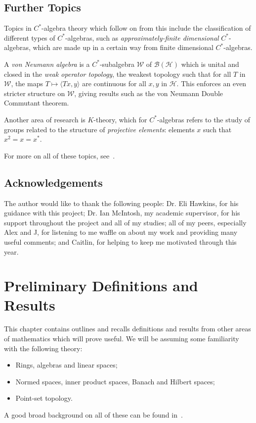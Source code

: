 \documentclass[11pt,a4paper]{report}
\theoremstyle{plain}
\theoremstyle{definition}
\newcommand{\1}{\mathbbm{1}}
\renewcommand{\H}{\mathcal{H}}
\newcommand{\W}{\mathcal{W}}
\newcommand{\B}{\mathcal{B}}
\newcommand{\BH}{\mathcal{\B(\H)}}
\begin{document}
\section{Further Topics}
Topics in $C^\ast$-algebra theory which follow on from this include the 
classification of different types of $C^\ast$-algebras, such as 
\emph{approximately-finite dimensional} $C^\ast$-algebras, which are made up in 
a certain way from finite dimensional $C^\ast$-algebras.

A \emph{von Neumann algebra }is a $C^\ast$-subalgebra $\W$ of $\BH$ which is 
unital and closed in the \emph{weak operator topology}, the weakest topology 
such that for all $T$ in $\W$, the maps $T\mapsto\langle Tx,y\rangle$ are 
continuous for all $x,y$ in $\H$. This enforces an even stricter structure on 
$\W$, giving results such as the von Neumann Double Commutant theorem.

Another area of research is $K$-theory, which for $C^\ast$-algebras refers to 
the study of groups related to the structure of \emph{projective elements}:
elements $x$ such that $x^2 = x = x^\ast$.

For more on all of these topics, see~\cite{dixmier81,sakai71,davidson96}.

\iftrue
\section*{Acknowledgements}
The author would like to thank the following people: Dr. Eli Hawkins, for his 
guidance with this project; Dr. Ian McIntosh, my academic supervisor, for his 
support throughout the project and all of my studies; all of my peers, 
especially Alex and J, for listening to me waffle on about my work and 
providing many useful comments; and Caitlin, for helping to keep me motivated 
through this year.
\fi

\chapter{Preliminary Definitions and Results} 
This chapter contains outlines and recalls definitions and results from other 
areas of mathematics which will prove useful.
We will be assuming some familiarity with the following theory:
\begin{itemize}
	\item Rings, algebras and linear spaces;
	\item Normed spaces, inner product spaces, Banach and Hilbert spaces;
	\item Point-set topology.
\end{itemize}
A good broad background on all of these can be found in~\cite{rudin91,simmons83}.
\end{document}
